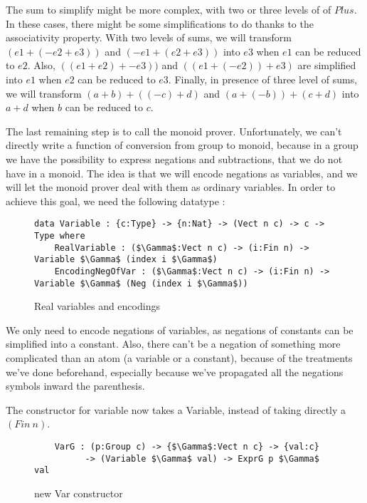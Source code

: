The sum to simplify might be more complex, with two or three levels of of $Plus$. In these cases, there might be some simplifications to do thanks to the associativity property. With two levels of sums, we will transform $(e1 + (-e2 + e3))$ and $(-e1 + (e2+e3))$ into $e3$ when $e1$ can be reduced to $e2$. Also, $((e1+e2) + -e3))$ and $((e1+(-e2)) + e3)$ are simplified into $e1$ when $e2$ can be reduced to $e3$. Finally, in presence of three level of sums, we will transform $(a+b) + ((-c)+d)$ and $(a+(-b)) + (c+d)$ into $a+d$ when $b$ can be reduced to $c$.

The last remaining step is to call the monoid prover. Unfortunately, we can't directly write a function of conversion from group to monoid, because in a group we have the possibility to express negations and subtractions, that we do not have in a monoid. The idea is that we will encode negations as variables, and we will let the monoid prover deal with them as ordinary variables. In order to achieve this goal, we need the following datatype :


\begin{figure}[H]
\figrule
\begin{center}
\begin{lstlisting}
data Variable : {c:Type} -> {n:Nat} -> (Vect n c) -> c -> Type where
    RealVariable : ($\Gamma$:Vect n c) -> (i:Fin n) -> Variable $\Gamma$ (index i $\Gamma$)
    EncodingNegOfVar : ($\Gamma$:Vect n c) -> (i:Fin n) -> Variable $\Gamma$ (Neg (index i $\Gamma$))
\end{lstlisting}
\end{center}
\caption{Real variables and encodings}
\figrule
\end{figure}

We only need to encode negations of variables, as negations of constants can be simplified into a constant. Also, there can't be a negation of something more complicated than an atom (a variable or a constant), because of the treatments we've done beforehand, especially because we've propagated all the negations symbols inward the parenthesis.

The constructor for variable now takes a Variable, instead of taking directly a $(Fin\ n)$.
\begin{figure}[H]
\figrule
\begin{center}
\begin{lstlisting}
    VarG : (p:Group c) -> {$\Gamma$:Vect n c} -> {val:c} 
          -> (Variable $\Gamma$ val) -> ExprG p $\Gamma$ val
\end{lstlisting}
\end{center}
\caption{new Var constructor}
\figrule
\end{figure}

